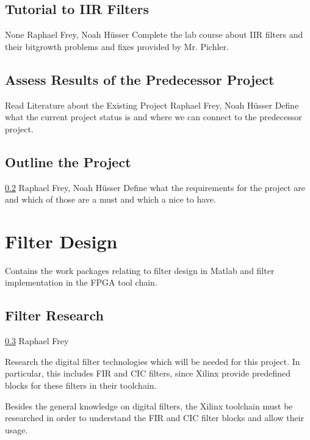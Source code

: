 \documentclass[a4paper,oneside]{alpenspecs/alpenspecs}
\begin{document}
\subsection{Tutorial to IIR Filters}
\label{subsec:general:iir}

\wpac
    {}
    {}
    {}
    {None}
    {}
    {Raphael Frey, Noah Hüsser}
    {%
        Complete the lab course about IIR filters and their bitgrowth problems and fixes provided by Mr. Pichler.
    }

\subsection{Assess Results of the Predecessor Project}
\label{subsec:general:assess}

\wpac
    {}
    {}
    {}
    {Read Literature about the Existing Project}
    {}
    {Raphael Frey, Noah Hüsser}
    {%
        Define what the current project status is and where we can connect to the predecessor project.
    }

\subsection{Outline the Project}
\label{subsec:general:outline}

\wpac
    {}
    {}
    {}
    {\ref{subsec:general:assess}}
    {}
    {Raphael Frey, Noah Hüsser}
    {%
        Define what the requirements for the project are and which of those are a must and which a nice to have.
    }

\section{Filter Design}
\label{sec:filters}

Contains the  work packages  relating to  filter design  in Matlab  and filter
implementation in the FPGA tool chain.

\subsection{Filter Research}
\label{subsec:filter:research}

\wpac
    {}
    {}
    {}
    {\ref{subsec:general:outline}}
    {}
    {Raphael Frey}
    {%
        Research the digital filter technologies which will be needed for this
        project. In particular, this includes FIR and CIC filters, since Xilinx
        provide predefined blocks for these filters in their toolchain.

        Besides the general knowledge on digital filters, the Xilinx toolchain
        must be researched in order to understand the FIR and CIC filter blocks
        and allow their usage.
    }
\end{document}
